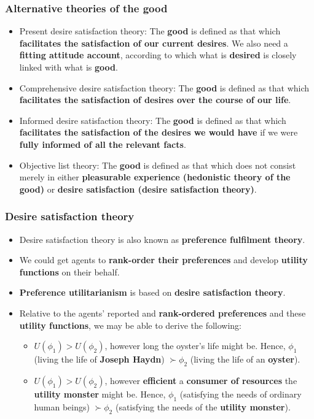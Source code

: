 \documentclass[11pt]{article}
\begin{document}
 \newpage
\subsubsection{Alternative theories of the good}
\label{sec:orgd0cc555}
\begin{itemize}
\item Present desire satisfaction theory:
The \textbf{good} is defined as that which \textbf{facilitates the satisfaction of our current desires}. We also need a \textbf{fitting attitude account}, according to which what is \textbf{desired} is closely linked with what is \textbf{good}.
\item Comprehensive desire satisfaction theory:
The \textbf{good} is defined as that which \textbf{facilitates the satisfaction of desires over the course of our life}.
\item Informed desire satisfaction theory:
The \textbf{good} is defined as that which \textbf{facilitates the satisfaction of the desires we would have} if we were \textbf{fully informed of all the relevant facts}.
\item Objective list theory:
The \textbf{good} is defined as that which does not consist merely in either \textbf{pleasurable experience (hedonistic theory of the good)} or \textbf{desire satisfaction (desire satisfaction theory)}.
\end{itemize}
\subsubsection{Desire satisfaction theory}
\label{sec:orgdb6b199}
\begin{itemize}
\item Desire satisfaction theory is also known as \textbf{preference fulfilment theory}.
\item We could get agents to \textbf{rank-order their preferences} and develop \textbf{utility functions} on their behalf.
\item \textbf{Preference utilitarianism} is based on \textbf{desire satisfaction theory}.
\item Relative to the agents' reported and \textbf{rank-ordered preferences} and these \textbf{utility functions}, we may be able to derive the following:
\begin{itemize}
\item \(U (\phi_1) > U (\phi_2)\), however long the oyster's life might be. Hence, \(\phi_1\) (living the life of \textbf{Joseph Haydn}) \(\succ \phi_2\) (living the life of an \textbf{oyster}).
\item \(U (\phi_1) > U (\phi_2)\), however \textbf{efficient} a \textbf{consumer of resources} the \textbf{utility monster} might be.
Hence, \(\phi_1\) (satisfying the needs of ordinary human beings) \(\succ \phi_2\) (satisfying the needs of the \textbf{utility monster}).
\end{itemize}
\end{itemize}
\end{document}
